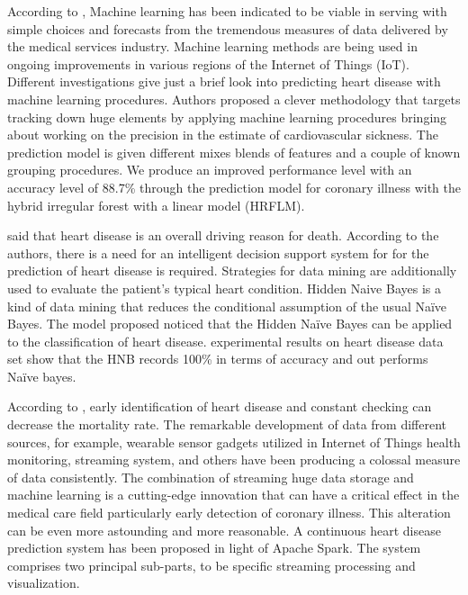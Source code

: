 {According to \citealp{mohan2019effective}, Machine learning has been indicated to be viable in serving with simple choices and forecasts from the tremendous measures of data delivered by the medical services industry. Machine learning methods are being used in ongoing improvements in various regions of the Internet of Things (IoT). Different investigations give just a brief look into predicting heart disease with machine learning procedures. Authors proposed a clever methodology that targets tracking down huge elements by applying machine learning procedures bringing about working on the precision in the estimate of cardiovascular sickness. The prediction model is given different mixes blends of features and a couple of known grouping procedures. We produce an improved performance level with an accuracy level of 88.7\% through the prediction model for coronary illness with the hybrid irregular forest with a linear model (HRFLM).

\citealp{jabbar2016heart} said that heart disease is an overall driving reason for death. According to the authors, there is a need for an intelligent decision support system for for the prediction of heart disease is required. Strategies for data mining are additionally used to evaluate the patient's typical heart condition. Hidden Naive Bayes is a kind of data mining that reduces the conditional assumption of the usual Naïve Bayes. The model proposed noticed that the Hidden Naïve Bayes can be applied to the classification of heart disease. experimental results on heart disease data set show that the HNB records 100\% in terms of accuracy and out performs Naïve bayes.

According to \citealp{ed2019real}, early identification of heart disease and constant checking can decrease the mortality rate. The remarkable development of data from different sources, for example, wearable sensor gadgets utilized in Internet of Things health monitoring, streaming system, and others have been producing a colossal measure of data consistently. The combination of streaming huge data storage and machine learning is a cutting-edge innovation that can have a critical effect in the medical care field particularly early detection of coronary illness. This alteration can be even more astounding and more reasonable. A continuous heart disease prediction system has been proposed in light of Apache Spark. The system comprises two principal sub-parts, to be specific streaming processing and visualization.

}
